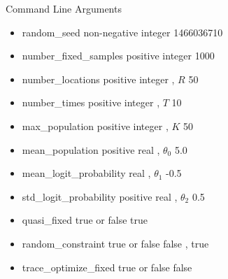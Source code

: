 \documentclass{beamer}
\begin{document}
\begin{frame}{Command Line Arguments}
\fontsize{10}{11}\selectfont
\begin{itemize}

\item
random\_seed
\hspace{4em} non-negative integer
\hspace{0em} 1466036710
\pause

\item
number\_fixed\_samples
\hspace{0.2em} positive integer
\hspace{2.1em} 1000
\pause

\item
number\_locations
\hspace{2.0em} positive integer , $R$
\hspace{0.6em} 50
\pause

\item
number\_times
\hspace{3.5em} positive integer , $T$
\hspace{0.5em} 10
\pause

\item
max\_population
\hspace{2.7em} positive integer , $K$
\hspace{0.5em} 50
\pause

\item
mean\_population
\hspace{2.2em} positive real , $\theta_0$
\hspace{1.8em} 5.0
\pause

\item
mean\_logit\_probability
\hspace{0em} real , $\theta_1$
\hspace{5.1em} -0.5
\pause

\item
std\_logit\_probability
\hspace{1em} positive real , $\theta_2$
\hspace{1.9em} 0.5
\pause

\item
quasi\_fixed
\hspace{4.8em} true or false
\hspace{3.8em} true
\pause

\item
random\_constraint
\hspace{1.6em} true or false
\hspace{3.8em} false , true
\pause

\item
trace\_optimize\_fixed
\hspace{1em} true or false
\hspace{3.8em} false
\pause

\end{itemize}
\end{frame}
\end{document}
